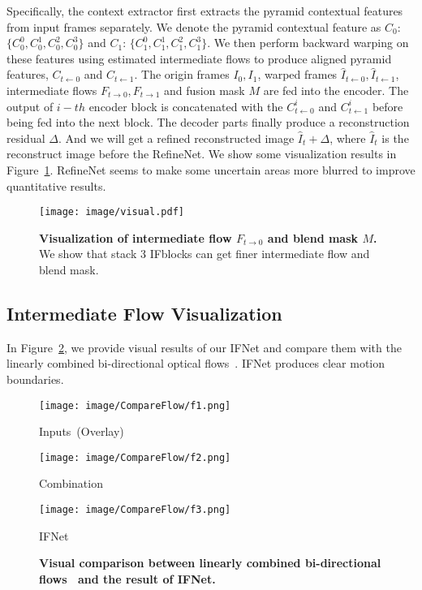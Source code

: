 \documentclass[final]{cvpr}
\begin{document}
Specifically, the context extractor first extracts the pyramid contextual features from input frames separately. We denote the pyramid contextual feature as $C_0$: $\{C_0^0, C_0^1, C_0^2, C_0^3\}$ and $C_1$: $\{C_1^0, C_1^1, C_1^2, C_1^3\}$. We then perform backward warping on these features using estimated intermediate flows to produce aligned pyramid features, $C_{t \leftarrow 0}$ and $C_{t \leftarrow 1}$. The origin frames $I_0, I_1$, warped frames $\widehat{I}_{t\leftarrow 0}, \widehat{I}_{t\leftarrow 1}$, intermediate flows $F_{t\rightarrow 0}, F_{t\rightarrow 1}$ and fusion mask $M$ are fed into the encoder. The output of $i-th$ encoder block is concatenated with the $C_{t \leftarrow 0}^{i}$ and $C_{t \leftarrow 1}^{i}$ before being fed into the next block. The decoder parts finally produce a reconstruction residual $\Delta$. And we will get a refined reconstructed image $\widehat{I}_t + \Delta$, where $\widehat{I}_t$ is the reconstruct image before the RefineNet. We show some visualization results in Figure~\ref{fig:mb}. RefineNet seems to make some uncertain areas more blurred to improve quantitative results. 

\begin{figure}[h]
	\centering
	\texttt{[image: image/visual.pdf]}
	\caption{\textbf{Visualization of intermediate flow $F_{t\rightarrow 0}$ and blend mask $M$.} We show that stack 3 IFblocks can get finer intermediate flow and blend mask.  }\label{fig:mb}
\end{figure}

\subsection{Intermediate Flow Visualization}
In Figure~\ref{fig:compare_flow}, we provide visual results of our IFNet and compare them with the linearly combined bi-directional optical flows~\cite{jiang2018super}. IFNet produces clear motion boundaries.

\begin{figure}[h]
	\centering
	\begin{minipage}[t]{0.325\linewidth}
		\centering
		\texttt{[image: image/CompareFlow/f1.png]}
		\centerline{Inputs~(Overlay)}
	\end{minipage}
	\begin{minipage}[t]{0.325\linewidth}
		\centering
		\texttt{[image: image/CompareFlow/f2.png]}
		\centerline{Combination}
	\end{minipage}
	\begin{minipage}[t]{0.325\linewidth}
		\centering
		\texttt{[image: image/CompareFlow/f3.png]}
		\centerline{IFNet}
	\end{minipage}
	
	\caption{\textbf{Visual comparison between linearly combined bi-directional flows~\cite{jiang2018super} and the result of IFNet.} }
	\label{fig:compare_flow}
	\vspace{-1em}
\end{figure}
\end{document}
